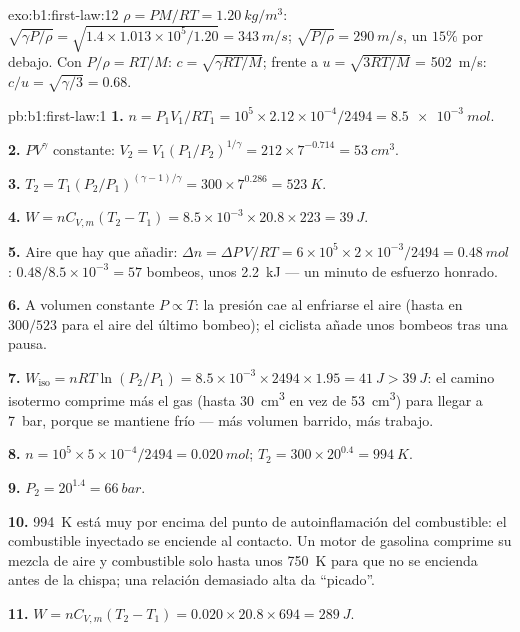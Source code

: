 \begin{solution}{exo:b1:first-law:12}
$\rho = PM/RT = \qty{1.20}{kg/m^3}$: $\sqrt{\gamma P/\rho} = \sqrt{1.4 \times
1.013\times10^5/1.20} = \qty{343}{m/s}$; $\sqrt{P/\rho} = \qty{290}{m/s}$, un $15\%$
por debajo. Con $P/\rho = RT/M$: $c = \sqrt{\gamma RT/M}$; frente a $u = \sqrt{3RT/M}$
= \qty{502}{m/s}: $c/u = \sqrt{\gamma/3} = 0.68$.
\end{solution}

\begin{solution}{pb:b1:first-law:1}
\textbf{1.} $n = P_1V_1/RT_1 = 10^5 \times 2.12\times10^{-4}/2494 = \qty{8.5e-3}{mol}$.

\textbf{2.} $PV^\gamma$ constante: $V_2 = V_1(P_1/P_2)^{1/\gamma} = 212 \times
7^{-0.714} = \qty{53}{cm^3}$.

\textbf{3.} $T_2 = T_1(P_2/P_1)^{(\gamma - 1)/\gamma} = 300 \times 7^{0.286} =
\qty{523}{K}$.

\textbf{4.} $W = nC_{V,m}(T_2 - T_1) = 8.5\times10^{-3} \times 20.8 \times 223 =
\qty{39}{J}$.

\textbf{5.} Aire que hay que añadir: $\Delta n = \Delta P\,V/RT = 6\times10^5 \times 2\times10^{-3}/
2494 = \qty{0.48}{mol}$: $0.48/8.5\times10^{-3} = 57$ bombeos, unos
\qty{2.2}{kJ} --- un minuto de esfuerzo honrado.

\textbf{6.} A volumen constante $P \propto T$: la presión cae al enfriarse
el aire (hasta en $300/523$ para el aire del último bombeo); el ciclista
añade unos bombeos tras una pausa.

\textbf{7.} $W_{\text{iso}} = nRT\ln(P_2/P_1) = 8.5\times10^{-3} \times 2494 \times
1.95 = \qty{41}{J} > \qty{39}{J}$: el camino isotermo comprime más el gas
(hasta \qty{30}{cm^3} en vez de \qty{53}{cm^3}) para llegar a \qty{7}{bar},
porque se mantiene frío --- más volumen barrido, más trabajo.

\textbf{8.} $n = 10^5 \times 5\times10^{-4}/2494 = \qty{0.020}{mol}$; $T_2 =
300 \times 20^{0.4} = \qty{994}{K}$.

\textbf{9.} $P_2 = 20^{1.4} = \qty{66}{bar}$.

\textbf{10.} \qty{994}{K} está muy por encima del punto de autoinflamación
del combustible: el combustible inyectado se enciende al contacto. Un
motor de gasolina comprime su mezcla de aire y combustible solo hasta unos
\qty{750}{K} para que no se encienda antes de la chispa; una relación
demasiado alta da ``picado''.

\textbf{11.} $W = nC_{V,m}(T_2 - T_1) = 0.020 \times 20.8 \times 694 = \qty{289}{J}$.


\end{solution}
